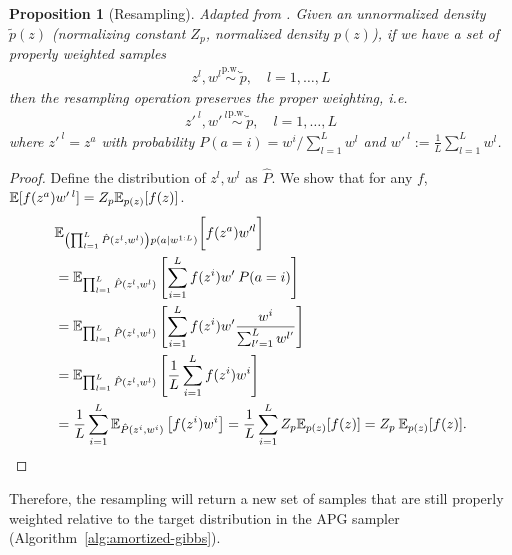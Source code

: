 \documentclass{article}
\newtheorem{proposition}{Proposition}
\theoremstyle{definition}
\newcommand{\pw}{\overset{\text{p.w.}}{\sim}
}
\begin{document}
\begin{proposition}[Resampling]
\label{proposition:resampling}
    Adapted from \cite[Section 3.1]{naesseth2015nested}.
    Given an unnormalized density $\tilde p(z)$ (normalizing constant $Z_p$, normalized density $p(z)$), if we have a set of properly weighted samples
    \begin{align}
        z^l, w^l \pw \tilde p,  \quad l = 1,\ldots, L \label{eq:bla}
    \end{align}
    then the resampling operation preserves the proper weighting, i.e.
    \begin{align*}
        z'^{\:l}, w'^{\:l} \pw \tilde p, \quad l = 1,\ldots, L
    \end{align*}
    where $z'^{\:l} = z^{a}$ with probability $P(a = i) = w^i / \sum_{l=1}^L w^l$ and $w'^{\:l} := \frac{1}{L} \sum_{l = 1}^L w^l$.
\end{proposition}
\begin{proof}
    Define the distribution of $z^l, w^l$ as $\hat{P}$.
    We show that for any $f$, $\mathbb{E}[f(z^{a}) w'^{\:l}] = Z_p \mathbb{E}_{p(z)}[f(z)]$.
    \begin{align*}
    &
        \mathbb{E}_{\left(\prod_{l=1}^L \hat{P}(z^l, w^l)\right) p(a \mid w^{1:L})} \bigg[f(z^{a}) w'^{l}\bigg] \\
        &= \mathbb{E}_{\prod_{l=1}^L \hat{P}(z^l, w^l)}\left[\sum_{i = 1}^L f(z^i) w' \: P(a = i)\right]  \\
        &= \mathbb{E}_{\prod_{l=1}^L \hat{P}(z^l, w^{l})}\left[\sum_{i = 1}^L f(z^i) w'  \frac{w^i}{ \sum_{l'=1}^L w^{l'}}\right]  \\
        &= \mathbb{E}_{\prod_{l=1}^L \hat{P}(z^l, w^l)}\left[\frac{1}{L}\sum_{i = 1}^L f(z^i) w^i\right] \\
        &= \frac{1}{L}\sum_{i = 1}^L \mathbb{E}_{\hat{P}(z^i, w^i)}\left[f(z^i) w^i\right]
        = \frac{1}{L}\sum_{i = 1}^L Z_p \mathbb{E}_{p(z)}[f(z)]
        = Z_p \: \mathbb{E}_{p(z)}[f(z)]. 
    \end{align*}
\end{proof}
Therefore, the resampling will return a new set of samples that are still properly weighted relative to the target distribution in the APG sampler (Algorithm~\ref{alg:amortized-gibbs}).
\end{document}

